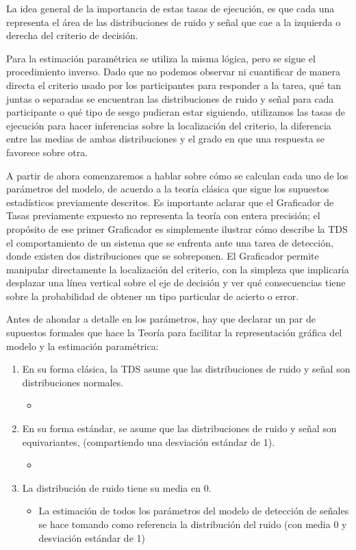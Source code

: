 La idea general de la importancia de estas tasas de ejecución, es que cada una representa el área de las distribuciones de ruido y señal que cae a la izquierda o derecha del criterio de decisión.

Para la estimación paramétrica se utiliza la misma lógica, pero se sigue el procedimiento inverso. Dado que no podemos observar ni cuantificar de manera directa el criterio usado por los participantes para responder a la tarea, qué tan juntas o separadas se encuentran las distribuciones de ruido y señal para cada participante o qué tipo de sesgo pudieran estar siguiendo, utilizamos las tasas de ejecución para hacer inferencias sobre la localización del criterio, la diferencia entre las medias de ambas distribuciones y el grado en que una respuesta se favorece sobre otra. 

A partir de ahora comenzaremos a hablar sobre cómo se calculan cada uno de los parámetros del modelo, de acuerdo a la teoría clásica que sigue los supuestos estadísticos previamente descritos.  Es importante aclarar que el Graficador de Tasas previamente expuesto no representa la teoría con entera precisión; el propósito de ese primer Graficador es simplemente ilustrar cómo describe la TDS el comportamiento de un sistema que se enfrenta ante una tarea de detección, donde existen dos distribuciones que se sobreponen. El Graficador permite manipular directamente la localización del criterio, con la simpleza que implicaría desplazar una línea vertical sobre el eje de decisión y ver qué consecuencias tiene sobre la probabilidad de obtener un tipo particular de acierto o error.


Antes de ahondar a detalle en los parámetros, hay que declarar un par de supuestos formales que hace la Teoría para facilitar la representación gráfica del modelo y la estimación paramétrica:

\begin{enumerate}
\item En su forma clásica, la TDS asume que las distribuciones de ruido y señal son distribuciones normales.
  \begin{itemize}
  \item 
  \end{itemize}
\item En su forma estándar, se asume que las distribuciones de ruido y señal son equivariantes, (compartiendo una desviación estándar de 1).
  \begin{itemize}
  \item 
  \end{itemize}
\item La distribución de ruido tiene su media en 0. 
  \begin{itemize}
  \item La estimación de todos los parámetros del modelo de detección de señales se hace tomando como referencia la distribución del ruido (con  media 0 y desviación estándar de 1)
  \end{itemize}
\end{enumerate}



